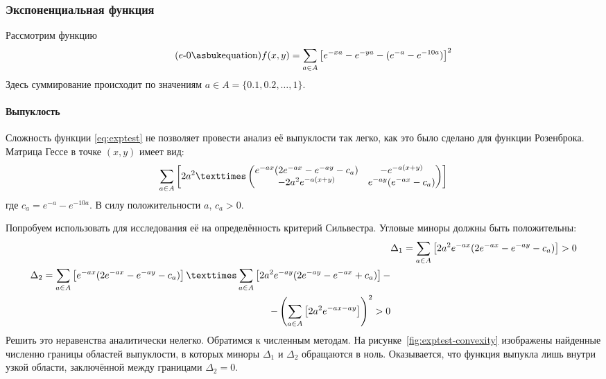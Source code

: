 \subsubsection{Экспоненциальная функция}
\label{sec:exptest}

Рассмотрим функцию
\begin{equation}
  \label{eq:exptest}
  \tag{$e$-\theequation}
  f(x, y) = \suml_{a\in A}\left [
    e^{-xa}-e^{-ya}-(e^{-a}-e^{-10a})\right ]^2
\end{equation}
Здесь суммирование происходит по значениям $a \in A =\{0.1, 0.2, \dotsc, 1\}$.

\paragraph{Выпуклость}

Сложность функции \eqref{eq:exptest} не позволяет провести анализ её
выпуклости так легко, как это было сделано для функции Розенброка.
Матрица Гессе в точке $(x, y)$ имеет вид:
\begin{equation}
  \label{eq:exptest-hess}
  \suml_{a\in A}\left[2a^2×
  \begin{pmatrix}
    e^{-ax}(2e^{-ax}-e^{-ay}-c_a) & -e^{-a(x+y)} \\
    -2a^2e^{-a(x+y)} & e^{-ay}(e^{-ax}-c_a)
  \end{pmatrix}\right]
\end{equation}
где $c_a = e^{-a}-e^{-10a}$. В силу положительности $a$, $c_a>0$.

Попробуем использовать для исследования её на определённость критерий
Сильвестра. Угловые миноры должны быть положительны:
\begin{align*}
  &\Delta_1 = \suml_{a\in A}
  \left[ 2a^2e^{-ax}(2e^{-ax}-e^{-ay}-c_a) \right] > 0\\
  \begin{split}
    \Delta_2 = \suml_{a\in A}
    \left[ e^{-ax}(2e^{-ax}-e^{-ay}-c_a) \right]×
    \suml_{a\in A}
    \left[ 2a^2e^{-ay}(2e^{-ay}-e^{-ax}+c_a) \right]-\\
    -\left(\suml_{a\in A}
      \left[ 2a^2e^{-ax-ay} \right] \right)^2
    > 0
  \end{split}
\end{align*}
Решить это неравенства аналитически нелегко. Обратимся к численным
методам. На рисунке \ref{fig:exptest-convexity} изображены найденные
численно границы областей выпуклости, в которых миноры $\Delta_1$ и
$\Delta_2$ обращаются в ноль. Оказывается, что функция выпукла лишь
внутри узкой области, заключённой между границами $\Delta_2=0$.

